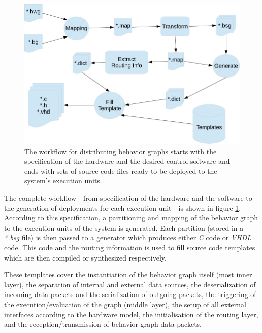 \documentclass[a4paper,twocolumn]{esapub2005} %
\begin{document}
\begin{figure}[t]
    \centering
    \includegraphics[width=.45\textwidth]{pics/Workflow.png}
    \caption{
        The workflow for distributing behavior graphs starts with the specification of the hardware and the desired control software and
        ends with sets of source code files ready to be deployed to the system's execution units.
    }
    \label{fig:Workflow}
\end{figure}
The complete workflow - from specification of the hardware and the software to the generation of deployments for each execution unit - is shown in figure \ref{fig:Workflow}.
According to this specification, a partitioning and mapping of the behavior graph to the execution units of the system is generated.
Each partition (stored in a \emph{*.bsg} file) is then passed to a generator which produces either \emph{C} code or \emph{VHDL} code.
This code and the routing information is used to fill source code templates which are then compiled or synthesized respectively.

These templates cover the instantiation of the behavior graph itself (most inner layer),
the separation of internal and external data sources,
the deserialization of incoming data packets and the serialization of outgoing packets,
the triggering of the execution/evaluation of the graph (middle layer),
the setup of all external interfaces according to the hardware model,
the initialisation of the routing layer, and
the reception/transmission of behavior graph data packets.
\end{document}

